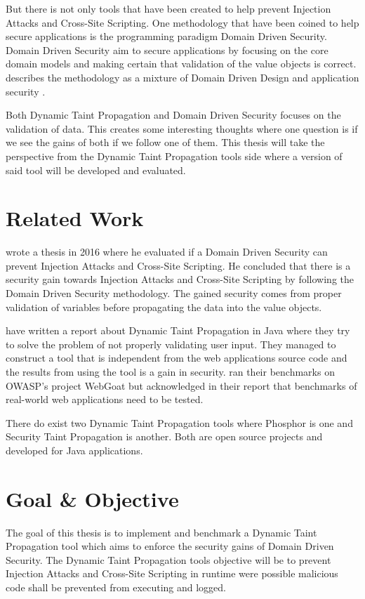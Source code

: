 \documentclass{../kththesis}
\begin{document}
But there is not only tools that have been created to help prevent Injection Attacks and Cross-Site Scripting. One methodology that have been coined to help secure applications is the programming paradigm Domain Driven Security. Domain Driven Security aim to secure applications by focusing on the core domain models and making certain that validation of the value objects is correct. \textcite{Wilander2009} describes the methodology as a mixture of Domain Driven Design and application security \parencite{Wilander2009, Johnsson2009}.

Both Dynamic Taint Propagation and Domain Driven Security focuses on the validation of data. This creates some interesting thoughts where one question is if we see the gains of both if we follow one of them. This thesis will take the perspective from the Dynamic Taint Propagation tools side where a version of said tool will be developed and evaluated. 



\section{Related Work}
\textcite{Stendahl2016} wrote a thesis in 2016 where he evaluated if a Domain Driven Security can prevent Injection Attacks and Cross-Site Scripting. He concluded that there is a security gain towards Injection Attacks and Cross-Site Scripting by following the Domain Driven Security methodology. The gained security comes from proper validation of variables before propagating the data into the value objects.

\textcite{Haldar} have written a report about Dynamic Taint Propagation in Java where they try to solve the problem of not properly validating user input. They managed to construct a tool that is independent from the web applications source code and the results from using the tool is a gain in security. \textcite{Haldar} ran their benchmarks on OWASP’s project WebGoat \parencite{webgoat} but acknowledged in their report that benchmarks of real-world web applications need to be tested.

There do exist two Dynamic Taint Propagation tools where Phosphor \parencite{phosphor} is one and Security Taint Propagation \parencite{securityTaint} is another. Both are open source projects and developed for Java applications.


\section{Goal \& Objective}
The goal of this thesis is to implement and benchmark a Dynamic Taint Propagation tool which aims to enforce the security gains of Domain Driven Security. The Dynamic Taint Propagation tools objective will be to prevent Injection Attacks and Cross-Site Scripting in runtime were possible malicious code shall be prevented from executing and logged.
\end{document}
